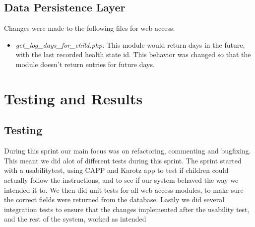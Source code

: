 \subsection{Data Persistence Layer}
Changes were made to the following files for web access:
\begin{itemize}
  \item \emph{get\_log\_days\_for\_child.php:} This module would return days in the future, with the last recorded health state id. This behavior was
		changed so that the module doesn't return entries for future days. 
\end{itemize}


\section{Testing and Results}
\label{sec:sprint5testingAndResults}

\subsection{Testing}
During this sprint our main focus was on refactoring, commenting and bugfixing. This meant we did alot of different tests during this sprint. 
The sprint started with a usabilitytest, using CAPP and Karotz app to test if children could actually follow the instructions, and to see if our system behaved
the way we intended it to. We then did unit tests for all web access modules, to make sure the correct fields were returned from the database. Lastly we 
did several integration tests to ensure that the changes implemented after the usability test, and the rest of the system, worked as intended



